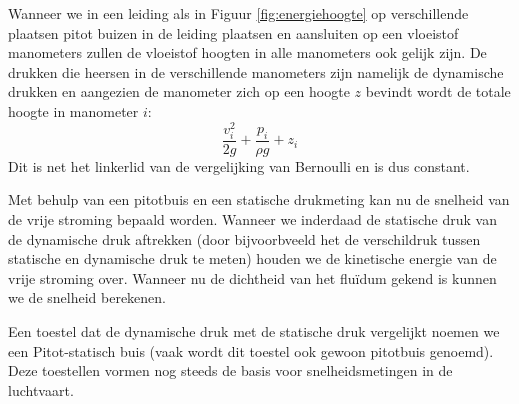 Wanneer we in een leiding als in Figuur \ref{fig:energiehoogte} op verschillende plaatsen pitot buizen in de leiding plaatsen en aansluiten op een vloeistof manometers zullen de vloeistof hoogten in alle manometers ook gelijk zijn. De drukken die heersen in de verschillende manometers zijn namelijk de dynamische drukken en aangezien de manometer zich op een hoogte $z$ bevindt wordt de totale hoogte in manometer $i$:
\begin{equation}
	\frac{v_i^2}{2 g} + \frac{p_i}{\rho g} + z_i
\end{equation}
Dit is net het linkerlid van de vergelijking van Bernoulli en is dus constant.

Met behulp van een pitotbuis en een statische drukmeting kan nu de snelheid van de vrije stroming bepaald worden. Wanneer we inderdaad de statische druk van de dynamische druk aftrekken (door bijvoorbveeld het de verschildruk tussen statische en dynamische druk te meten) houden we de kinetische energie van de vrije stroming over. Wanneer nu de dichtheid van het fluïdum gekend is kunnen we de snelheid berekenen.

Een toestel dat de dynamische druk met de statische druk vergelijkt noemen we een Pitot-statisch buis (vaak wordt dit toestel ook gewoon pitotbuis genoemd). Deze toestellen vormen nog steeds de basis voor snelheidsmetingen in de luchtvaart. 

